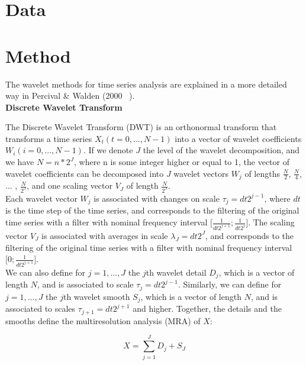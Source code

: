 \documentclass[draft]{agujournal2018}
\begin{document}
\section{Data}

\section{Method}

The wavelet methods for time series analysis are explained in a more detailed way in Percival \& Walden (2000 ~\cite{PER_2000}). \\

\textbf{Discrete Wavelet Transform}

The Discrete Wavelet Transform (DWT) is an orthonormal transform that transforms a time series $X_t \left( t = 0, ... , N - 1 \right)$ into a vector of wavelet coefficients $W_i \left( i = 0 , ... , N - 1 \right)$. If we denote $J$ the level of the wavelet decomposition, and we have $N = n* 2^J$, where n is some integer higher or equal to 1, the vector of wavelet coefficients can be decomposed into $J$ wavelet vectors $W_j$ of lengths $\frac{N}{2}$, $\frac{N}{4}$, ... , $\frac{N}{2^J}$, and one scaling vector $V_J$ of length $\frac{N}{2^J}$. \\

Each wavelet vector $W_j$ is associated with changes on scale $\tau_j = dt 2^{j - 1}$, where $dt$ is the time step of the time series, and corresponds to the filtering of the original time series with a filter with nominal frequency interval $\lbrack \frac{1}{dt 2^{j + 1}} ; \frac{1}{dt 2^j} \rbrack$. The scaling vector $V_J$ is associated with averages in scale $\lambda_J = dt 2^J$, and corresponds to the filtering of the original time series with a filter with nominal frequency interval $\lbrack 0 ; \frac{1}{dt 2^{j + 1}} \rbrack$. \\

We can also define for $j = 1 , ... , J$ the $j$th wavelet detail $D_j$, which is a vector of length $N$, and is associated to scale $\tau_j = dt 2^{j - 1}$. Similarly, we can define for $j = 1 , ... , J$ the $j$th wavelet smooth $S_j$, which is a vector of length $N$, and is associated to scales $\tau_{j + 1} = dt 2^{j + 1}$ and higher. Together, the details and the smooths define the multiresolution analysis (MRA) of $X$:

\begin{equation}
X = \sum_{j = 1}^{J} D_j + S_J
\end{equation}
\end{document}
